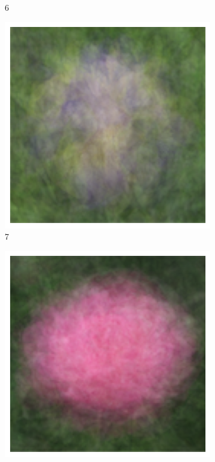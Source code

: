 \documentclass{article}
\begin{document}
\begin{figure}
\begin{subfigure}[b]{0.09\textwidth}
		\caption{6}
	\end{subfigure}
	\begin{subfigure}[b]{0.09\textwidth}
		\includegraphics[width= \textwidth]{ave7}
		\caption{7}
	\end{subfigure}
	\begin{subfigure}[b]{0.09\textwidth}
		\includegraphics[width= \textwidth]{ave8}

\end{subfigure}
\end{figure}
\end{document}

